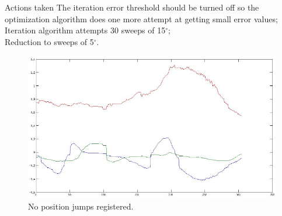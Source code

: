 \documentclass[10pt]{beamer}
\begin{document}

\begin{frame}[fragile]{Actions taken}
  The iteration error threshold should be turned off so the optimization algorithm does one more attempt at getting small error values;\\
  Iteration algorithm attempts 30 sweeps of 15$^{\circ}$;\\
  Reduction to sweeps of 5$^{\circ}$.\\
  \begin{figure}
    \centering
    \includegraphics[scale=0.35]{no-jumps.png}
    \caption{No position jumps registered.}
  \end{figure}
\end{frame}
\end{document}
